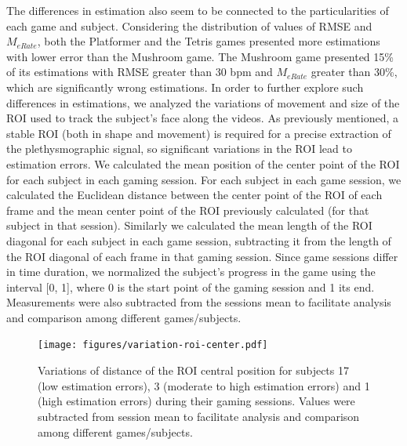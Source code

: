 The differences in estimation also seem to be connected to the particularities of each game and subject. Considering the distribution of values of RMSE and $M_{eRate}$, both the Platformer and the Tetris games presented more estimations with lower error than the Mushroom game. The Mushroom game presented 15\% of its estimations with RMSE greater than 30 bpm and $M_{eRate}$ greater than 30\%, which are significantly wrong estimations. In order to further explore such differences in estimations, we analyzed the variations of movement and size of the ROI used to track the subject's face along the videos. As previously mentioned, a stable ROI (both in shape and movement) is required for a precise extraction of the plethysmographic signal, so significant variations in the ROI lead to estimation errors. We calculated the mean position of the center point of the ROI for each subject in each gaming session. For each subject in each game session, we calculated the Euclidean distance between the center point of the ROI of each frame and the mean center point of the ROI previously calculated (for that subject in that session). Similarly we calculated the mean length of the ROI diagonal for each subject in each game session, subtracting it from the length of the ROI diagonal of each frame in that gaming session. Since game sessions differ in time duration, we normalized the subject's progress in the game using the interval [0, 1], where 0 is the start point of the gaming session and 1 its end. Measurements were also subtracted from the sessions mean to facilitate analysis and comparison among different games/subjects.

\begin{figure}[!t]
\centering
\texttt{[image: figures/variation-roi-center.pdf]}
\caption{Variations of distance of the ROI central position for subjects 17 (low estimation errors), 3 (moderate to high estimation errors) and 1 (high estimation errors) during their gaming sessions. Values were subtracted from session mean to facilitate analysis and comparison among different games/subjects.}
\label{fig:chart-roi-anomalies-center}
\end{figure}

